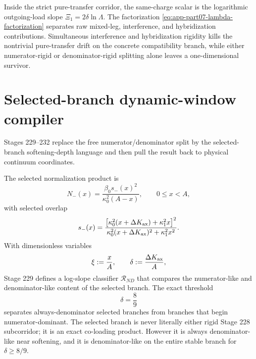 \begin{theorem}
\label{thm:app-part07-pure-transfer-sieve}
Inside the strict pure-transfer corridor, the same-charge scalar is the logarithmic outgoing-load slope \(\Xi_1=2\delta\ln\Lambda\).  The factorization \cref{eq:app-part07-lambda-factorization} separates raw mixed-leg, interference, and hybridization contributions.  Simultaneous interference and hybridization rigidity kills the nontrivial pure-transfer drift on the concrete compatibility branch, while either numerator-rigid or denominator-rigid splitting alone leaves a one-dimensional survivor.
\end{theorem}


\section{Selected-branch dynamic-window compiler}
\label{sec:app-part07_same_charge_rigid_mouth:selected-branch-dynamic-window-compiler}

Stages 229--232 replace the free numerator/denominator split by the selected-branch softening-depth language and then pull the result back to physical continuum coordinates.

The selected normalization product is
\begin{equation}
\label{eq:app-part07-selected-nminus}
N_-(x)=\frac{\beta_0s_-(x)^2}{\kappa_0^2(A-x)},
\qquad
0\le x<A,
\end{equation}
with selected overlap
\begin{equation}
\label{eq:app-part07-selected-sminus}
s_-(x)=
\frac{\left[\kappa_0^2(x+\Delta K_{\rm ax})+\kappa_1^2x\right]^2}
{\kappa_0^2(x+\Delta K_{\rm ax})^2+\kappa_1^2x^2}.
\end{equation}
With dimensionless variables
\begin{equation}
\label{eq:app-part07-xi-delta-selected}
\xi:=\frac{x}{A},
\qquad
\delta:=\frac{\Delta K_{\rm ax}}{A},
\end{equation}
Stage 229 defines a log-slope classifier \(\mathcal R_{ND}\) that compares the numerator-like and denominator-like content of the selected branch.  The exact threshold
\begin{equation}
\label{eq:app-part07-delta-eight-ninths}
\delta=\frac89
\end{equation}
separates always-denominator selected branches from branches that begin numerator-dominant.  The selected branch is never literally either rigid Stage 228 subcorridor; it is an exact co-loading product.  However it is always denominator-like near softening, and it is denominator-like on the entire stable branch for \(\delta\ge8/9\).

